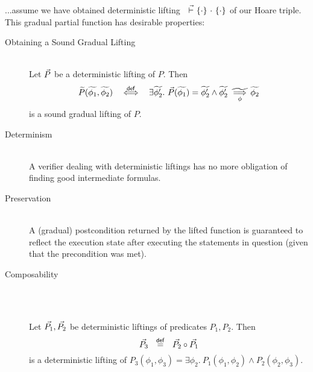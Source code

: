 ...assume we have obtained deterministic lifting ${~} \,\,\vec{\vdash}\,\, \{{\cdot}\} ~{\cdot}~ \{{\cdot}\}$ of our Hoare triple. %
This gradual partial function has desirable properties: %


\begin{description}
    \item[Obtaining a Sound Gradual Lifting]
    \begin{lemma}~\\
        Let $\vec{P}$ be a deterministic lifting of $P$.
        Then
        \begin{displaymath}
        \widetilde{P}(\widetilde{\phi_1}, \widetilde{\phi_2}) ~~\overset{\textup{\textsf{def}}}{\iff}~~ \exists \widetilde{\phi_2'}.~ \vec{P}(\widetilde{\phi_1}) = \widetilde{\phi_2'} \wedge {\widetilde{\phi_2'}} \,\,\underset{\phi}{\widetilde{\implies}}\, {\widetilde{\phi_2}}
        \end{displaymath}
        is a sound gradual lifting of $P$.
    \end{lemma}
    
    \item[Determinism]~\\
    A verifier dealing with deterministic liftings has no more obligation of finding good intermediate formulas.
    
    \item[Preservation]~\\
    A (gradual) postcondition returned by the lifted function is guaranteed to reflect the execution state after executing the statements in question (given that the precondition was met).
    
    \item[Composability]~\\
    \begin{lemma}~\\
        Let $\vec{P_1}, \vec{P_2}$ be deterministic liftings of predicates $P_1, P_2$.
        Then
        \begin{displaymath}
        \vec{P_3} ~~\overset{\textup{\textsf{def}}}{=}~~ \vec{P_2} \circ \vec{P_1}
        \end{displaymath}
        is a deterministic lifting of $P_3(\phi_1, \phi_3) = \exists \phi_2.~ P_1(\phi_1, \phi_2) \wedge P_2(\phi_2, \phi_3)$.
    \end{lemma}
\end{description}

